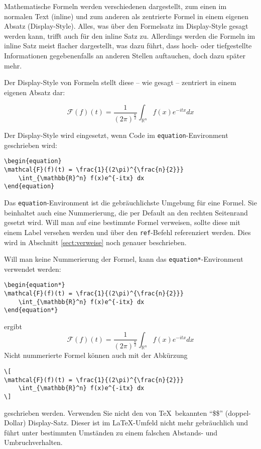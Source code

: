 Mathematische Formeln werden verschiedenen dargestellt, zum einen im normalen Text (inline) und zum anderen als zentrierte Formel in einem eigenen Absatz (Display-Style). Alles, was über den Formelsatz im Display-Style gesagt werden kann, trifft auch für den inline Satz zu. Allerdings werden die Formeln im inline Satz meist flacher dargestellt, was dazu führt, dass hoch- oder tiefgestellte Informationen gegebenenfalls an anderen Stellen auftauchen, doch dazu später mehr.

Der Display-Style von Formeln stellt diese -- wie gesagt -- zentriert in einem eigenen Absatz dar:

\begin{equation}
\mathcal{F}(f)(t) = \frac{1}{(2\pi)^{\frac{n}{2}}} 
	\int_{\mathbb{R}^n} f(x)e^{-itx} dx
\end{equation}

Der Display-Style wird eingesetzt, wenn Code im \texttt{equation}-Environment geschrieben wird:
\begin{verbatim}
\begin{equation}
\mathcal{F}(f)(t) = \frac{1}{(2\pi)^{\frac{n}{2}}} 
	\int_{\mathbb{R}^n} f(x)e^{-itx} dx
\end{equation}
\end{verbatim}
Das \texttt{equation}-Environment ist die gebräuchlichste Umgebung für eine Formel. Sie beinhaltet auch eine Nummerierung, die per Default an den rechten Seitenrand gesetzt wird. Will man auf eine bestimmte Formel verweisen, sollte diese mit einem Label versehen werden und über den \texttt{ref}-Befehl referenziert werden. Dies wird in Abschnitt \ref{sect:verweise} noch genauer beschrieben.

Will man keine Nummerierung der Formel, kann das \texttt{equation*}-En\-vi\-ron\-ment verwendet werden:
\begin{verbatim}
\begin{equation*}
\mathcal{F}(f)(t) = \frac{1}{(2\pi)^{\frac{n}{2}}} 
	\int_{\mathbb{R}^n} f(x)e^{-itx} dx
\end{equation*}
\end{verbatim}
ergibt
\begin{equation*}
\mathcal{F}(f)(t) = \frac{1}{(2\pi)^{\frac{n}{2}}} 
	\int_{\mathbb{R}^n} f(x)e^{-itx} dx
\end{equation*}
Nicht nummerierte Formel können auch mit der Abkürzung
\begin{verbatim}
\[
\mathcal{F}(f)(t) = \frac{1}{(2\pi)^{\frac{n}{2}}} 
	\int_{\mathbb{R}^n} f(x)e^{-itx} dx
\]
\end{verbatim}
geschrieben werden. Verwenden Sie nicht den von \TeX\ bekannten "`\$\$"' (doppel-Dollar) Display-Satz. Dieser ist im \LaTeX-Umfeld nicht mehr gebräuchlich und führt unter bestimmten Umständen zu einem falschen Abstands- und Umbruchverhalten.

